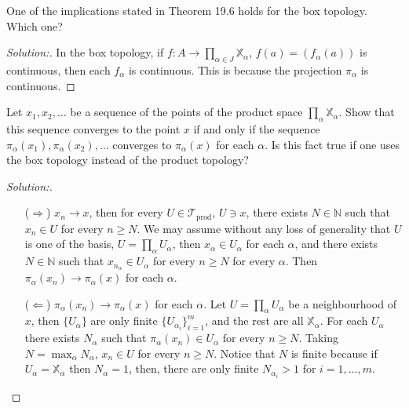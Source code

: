 \documentclass[a4paper,12pt, reqno]{article}
\theoremstyle{definition}
\newenvironment{exerr}[1]{
  \renewcommand\theexeralt{#1}
  \exeralt
}{\endexeralt}
\newenvironment{solution}{\begin{proof}[Solution:]}{\end{proof}}
\newcommand{\T}{\mathscr{T}}
\newcommand{\N}{\mathbb{N}}
\newcommand{\X}{\mathbb{X}}
\begin{document}
\begin{exerr}{5}
  One of the implications stated in Theorem 19.6 holds for the box topology. Which one?
\end{exerr}
\begin{solution}
  In the box topology, if $f:A\to\prod_{\alpha\in J}\X_{\alpha}$, $f(a) = (f_{\alpha}(a))$ is continuous, then each $f_{\alpha}$ is continuous. This is because the projection $\pi_{\alpha}$ is continuous.
\end{solution}
\begin{exerr}{6}
  Let $x_{1},x_{2},\dots$ be a sequence of the points of the product space $\prod_{\alpha}\X_{\alpha}$. Show that this sequence converges to the point $x$ if and only if the sequence $\pi_{\alpha}(x_{1}),\pi_{\alpha}(x_{2}),\dots$ converges to $\pi_{\alpha}(x)$ for each $\alpha$. Is this fact true if one uses the box topology instead of the product topology?
\end{exerr}
\begin{solution}\hfill
  \begin{itemize}
    \item[($\Longrightarrow$)] $x_{n}\to x$, then for every $U\in\T_{\text{prod}}$, $U\ni x$, there exists $N\in\N$ such that $x_{n}\in U$ for every $n\geq N$. We may assume without any loss of generality that $U$ is one of the basis, $U = \prod_{\alpha}U_{\alpha}$, then $x_{\alpha}\in U_{\alpha}$ for each $\alpha$, and there exists $N\in \N$ such that $x_{n_{\alpha}}\in U_{\alpha}$ for every $n\geq N$ for every $\alpha$. Then $\pi_{\alpha}(x_{n})\to\pi_{\alpha}(x)$ for each $\alpha$.
    \item[($\Longleftarrow$)] $\pi_{\alpha}(x_{n})\to\pi_{\alpha}(x)$ for each $\alpha$. Let $U = \prod_{\alpha}U_{\alpha}$ be a neighbourhood of $x$, then $\{ U_{\alpha} \}$ are only finite $\{ U_{\alpha_{i}} \}_{i=1}^m$, and the rest are all $\X_{\alpha}$. For each $U_{\alpha}$ there exists $N_{\alpha}$ such that $\pi_{\alpha}(x_{n})\in U_{\alpha}$ for every $n\geq N$. Taking $N = \max_{\alpha} N_{\alpha}$, $x_{n}\in U$ for every $n\geq N$. Notice that $N$ is finite because if $U_{\alpha} = \X_{\alpha}$ then $N_{\alpha}= 1$, then, there are only finite $N_{\alpha_{i}}>1$ for $i=1,\dots,m$.
  \end{itemize}
\end{solution}
\end{document}
